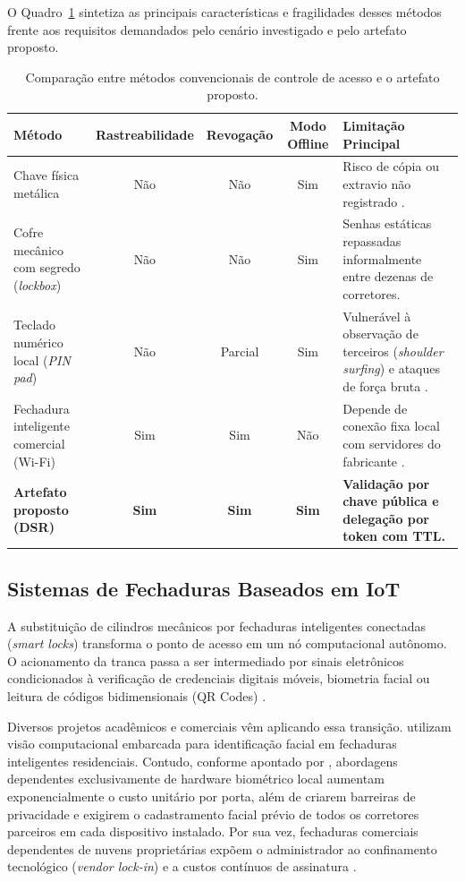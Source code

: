 O Quadro~\ref{quadro:comparativo-metodos} sintetiza as principais características e fragilidades desses métodos frente aos requisitos demandados pelo cenário investigado e pelo artefato proposto.

\begin{table}[htbp]
\centering
\footnotesize
\caption{Comparação entre métodos convencionais de controle de acesso e o artefato proposto.}
\label{quadro:comparativo-metodos}
\begin{tabularx}{\textwidth}{p{3.2cm}cccX}
\toprule
\textbf{Método} & \textbf{Rastreabilidade} & \textbf{Revogação} & \textbf{Modo Offline} & \textbf{Limitação Principal} \\
\midrule
Chave física metálica & Não & Não & Sim & Risco de cópia ou extravio não registrado \cite{camargosilvablockchain2023}. \\
Cofre mecânico com segredo (\textit{lockbox}) & Não & Não & Sim & Senhas estáticas repassadas informalmente entre dezenas de corretores. \\
Teclado numérico local (\textit{PIN pad}) & Não & Parcial & Sim & Vulnerável à observação de terceiros (\textit{shoulder surfing}) e ataques de força bruta \cite{shauto2024}. \\
Fechadura inteligente comercial (Wi-Fi) & Sim & Sim & Não & Depende de conexão fixa local com servidores do fabricante \cite{vardakis2024}. \\
\textbf{Artefato proposto (DSR)} & \textbf{Sim} & \textbf{Sim} & \textbf{Sim} & \textbf{Validação por chave pública e delegação por token com TTL.} \\
\bottomrule
\end{tabularx}
\end{table}

\subsection{Sistemas de Fechaduras Baseados em IoT}
\label{subsec:fechaduras-iot}

A substituição de cilindros mecânicos por fechaduras inteligentes conectadas (\textit{smart locks}) transforma o ponto de acesso em um nó computacional autônomo. O acionamento da tranca passa a ser intermediado por sinais eletrônicos condicionados à verificação de credenciais digitais móveis, biometria facial ou leitura de códigos bidimensionais (QR Codes) \cite{satanasaowapak2021, yolov5smartlock2025}.

Diversos projetos acadêmicos e comerciais vêm aplicando essa transição.  utilizam visão computacional embarcada para identificação facial em fechaduras inteligentes residenciais. Contudo, conforme apontado por , abordagens dependentes exclusivamente de hardware biométrico local aumentam exponencialmente o custo unitário por porta, além de criarem barreiras de privacidade e exigirem o cadastramento facial prévio de todos os corretores parceiros em cada dispositivo instalado. Por sua vez, fechaduras comerciais dependentes de nuvens proprietárias expõem o administrador ao confinamento tecnológico (\textit{vendor lock-in}) e a custos contínuos de assinatura \cite{camargosilvablockchain2023}.

